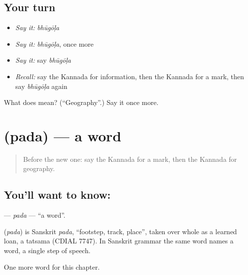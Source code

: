\subsection*{Your turn}
\begin{itemize}
\raggedright
  \item \emph{Say it:} \emph{bhūgōḷa}
  \item \emph{Say it:} \emph{bhūgōḷa}, once more
  \item \emph{Say it:} say \emph{bhūgōḷa}
  \item \emph{Recall:} say the Kannada for information, then the Kannada for a mark, then say \emph{bhūgōḷa} again
\end{itemize}

\begin{tcolorbox}[breakable,colback=teal!4,colframe=teal!35!black,title={Before you move on}]
What does  mean? (\textquotedblleft{}Geography\textquotedblright{}.) Say it once more.
\end{tcolorbox}
\section[\texorpdfstring{\kn{ಪದ} (pada)}{ಪದ (pada)}]{ (pada) — a word}

\label{lesson:KA-C270-pada}



\begin{quote}
Before the new one: say the Kannada for a mark, then the Kannada for geography.
\end{quote}

\subsection*{You'll want to know: }
\textbf{} — \emph{pada} — \textquotedblleft{}a word\textquotedblright{}.

\begin{cousinweb}
\textbf{} (\emph{pada}) is Sanskrit \emph{pada}, \textquotedblleft{}footstep, track, place\textquotedblright{}, taken over whole as a learned loan, a tatsama (CDIAL 7747). In Sanskrit grammar the same word names a word, a single step of speech.
\end{cousinweb}

\begin{grammarlens}[title={What you've built}]
One more word for this chapter.
\end{grammarlens}

